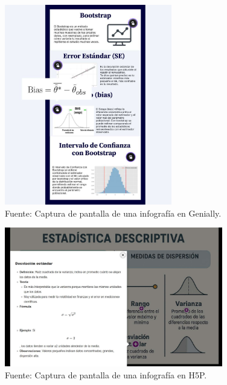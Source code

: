 \documentclass[letter,oneside,12pt,spanish]{report}
\begin{document}
\begin{figure}[ht]
	\centering
	\includegraphics[width=0.65\textwidth]{Figs/Infografia_Genially.pdf}
	\label{fig:Igenially}
	\\Fuente: Captura de pantalla de una infografía en Genially.
\end{figure}

\begin{figure}[ht]
	\centering
	\includegraphics[width=0.85\textwidth]{Figs/Infografia_H5P.pdf}
	\label{fig:H5P}
	\\Fuente: Captura de pantalla de una infografía en H5P.
\end{figure}
\end{document}
